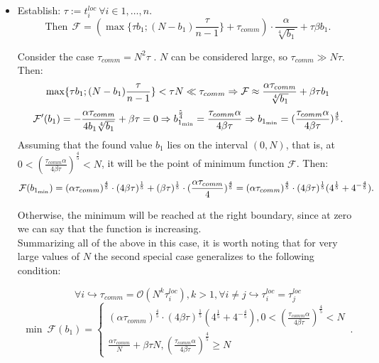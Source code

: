 \documentclass{article}
\begin{document}
\begin{itemize}
\item []
Establish: $\tau := t_i^{loc}~ \forall i \in {1,\ldots, n} $. 
\begin{equation}
        \text{Then} ~ ~\mathcal{F} = (\max\{\tau b_1; (N-b_1) \frac{\tau}{n-1}\} + \tau_{comm}) \cdot \frac{\alpha}{\sqrt[4]{b_1}}+\tau \beta b_1. 
\end{equation}

Consider the case $\tau_{comm} = N^2 \tau$ . $N$ can be considered large, so $\tau_{comm} \gg N\tau$. Then:
\begin{equation}
    \notag
     \max \{\tau b_1; (N-b_1)\frac{\tau}{n-1}\} < \tau N \ll \tau_{comm}\Rightarrow \mathcal{F} \approx \frac{\alpha \tau_{comm}}{\sqrt[4]{b_1}} + \beta \tau b_1 
\end{equation}
\begin{equation}
    \notag
    \mathcal{F}' (b_1) = -\frac{\alpha \tau_{comm}}{4b_1\sqrt[4]{b_1}} + \beta \tau = 0 \Rightarrow b_{1_{\min}}^\frac{5}{4} = \frac{\tau _{comm}\alpha}{4\beta\tau}\Rightarrow b_{1_{\min}} = (\frac{\tau _{comm}\alpha}{4\beta\tau})^{\frac{4}{5}}.
\end{equation}
Assuming that the found value $b_1$ lies on the interval $(0, N) $, that is, at $0 < (\frac{\tau _{comm}\alpha}{4\beta\tau})^{\frac{4}{5}} < N$, it will be the point of minimum function $\mathcal{F}$. Then:
\begin{equation}
    \notag
    \mathcal{F}(b_{1_{\min}}) = (\alpha \tau_{comm})^\frac{4}{5} \cdot (4\beta\tau)^\frac{1}{5} + (\beta \tau)^\frac{1}{5}\cdot(\frac{\alpha \tau_{comm}}{4})^\frac{4}{5} = (\alpha \tau_{comm})^\frac{4}{5}\cdot (4\beta\tau)^\frac{1}{5}(4^\frac{1}{5} + 4^{-\frac{4}{5}}).
\end{equation}
    
Otherwise, the minimum will be reached at the right boundary, since at zero we can say that the function is increasing.
    \\
Summarizing all of the above in this case, it is worth noting that for very large values of $N$ the second special case generalizes to the following condition:

\begin {equation} 
    \forall i  \hookrightarrow \tau_{comm} = \mathcal{O}( N^k \tau_i^{loc}), k >1 , \forall i\neq j\hookrightarrow \tau_i^{loc} = \tau_j^{loc}
\end {equation}
\begin {equation}          
\min ~ {\mathcal{F}}(b_1) = \begin{cases}
      (\alpha \tau_{comm})^\frac{4}{5}\cdot (4\beta\tau)^\frac{1}{5}(4^\frac{1}{5} + 4^{-\frac{4}{5}}),  0 < (\frac{\tau _{comm}\alpha}{4\beta\tau})^{\frac{4}{5}} < N\\
      \frac{\alpha\tau _{comm}}{N} + \beta \tau N , (\frac{\tau _{comm}\alpha}{4\beta\tau})^{\frac{4}{5}} \geq N
    \end{cases}\,.
\end {equation}
\end{itemize}
\end{document}
